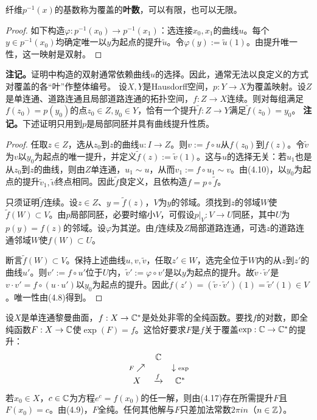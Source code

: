 纤维$p^{-1}(x)$的基数称为覆盖的\textbf{叶数}，可以有限，也可以无限。
\begin{proof}
如下构造$\varphi:p^{-1}(x_0)\to p^{-1}(x_1)$：选连接$x_0,x_1$的曲线$u$。每个$y\in p^{-1}(x_0)$均确定唯一以$y$为起点的提升$\widetilde u$。令$\varphi(y):=\widetilde u(1)$。由提升唯一性，这一映射是双射。
\end{proof}
\textbf{注记。}证明中构造的双射通常依赖曲线$u$的选择。因此，通常无法以良定义的方式对覆盖的各“叶”作整体编号。
设$X,Y$是Hausdorff空间，$p:Y\to X$为覆盖映射。设$Z$是单连通、道路连通且局部道路连通的拓扑空间，$f:Z\to X$连续。则对每组满足$f(z_0)=p(y_0)$的点$z_0\in Z,y_0\in Y$，恰有一个提升$\widetilde f:Z\to Y$满足$\widetilde f(z_0)=y_0$。
\textbf{注记。}下述证明只用到$p$是局部同胚并具有曲线提升性质。
\begin{proof}
任取$z\in Z$，选从$z_0$到$z$的曲线$u:I\to Z$。则$v:=f\circ u$从$f(z_0)$到$f(z)$。令$\widetilde v$为$v$以$y_0$为起点的唯一提升，并定义$\widetilde f(z):=\widetilde v(1)$。这与$u$的选择无关：若$u_1$也是从$z_0$到$z$的曲线，则由$Z$单连通，$u_1\sim u$，从而$v_1:=f\circ u_1\sim v$。由(4.10)，以$y_0$为起点的提升$\widetilde v_1,\widetilde v$终点相同。因此$\widetilde f$良定义，且依构造$f=p\circ\widetilde f$。

只须证明$\widetilde f$连续。设$z\in Z$、$y=\widetilde f(z)$，$V$为$y$的邻域。须找到$z$的邻域$W$使$\widetilde f(W)\subset V$。由$p$局部同胚，必要时缩小$V$，可假设$p|_V:V\to U$同胚，其中$U$为$p(y)=f(z)$的邻域。设$\varphi$为其逆。由$f$连续及$Z$局部道路连通，可选$z$的道路连通邻域$W$使$f(W)\subset U$。

断言$\widetilde f(W)\subset V$。保持上述曲线$u,v,\widetilde v$，任取$z'\in W$，选完全位于$W$内的从$z$到$z'$的曲线$u'$。则$v':=f\circ u'$位于$U$内，$\widetilde v':=\varphi\circ v'$是以$y$为起点的提升。故$\widetilde v\cdot\widetilde v'$是$v\cdot v'=f\circ(u\cdot u')$以$y_0$为起点的提升。因此$\widetilde f(z')=(\widetilde v\cdot\widetilde v')(1)=\widetilde v'(1)\in V$。唯一性由(4.8)得到。
\end{proof}
设$X$是单连通黎曼曲面，$f:X\to\mathbb C^*$是处处非零的全纯函数。要找$f$的对数，即全纯函数$F:X\to\mathbb C$使$\exp(F)=f$。这恰好要求$F$是$f$关于覆盖$\exp:\mathbb C\to\mathbb C^*$的提升：
\[
\begin{array}{ccc}&\mathbb C&\\{\scriptstyle F}\nearrow&&\downarrow{\scriptstyle\exp}\\X&\xrightarrow{f}&\mathbb C^*\end{array}
\]
若$x_0\in X$，$c\in\mathbb C$为方程$e^c=f(x_0)$的任一解，则由(4.17)存在所需提升$F$且$F(x_0)=c$。由(4.9)，$F$全纯。任何其他解与$F$只差加法常数$2\pi in$（$n\in\mathbb Z$）。
